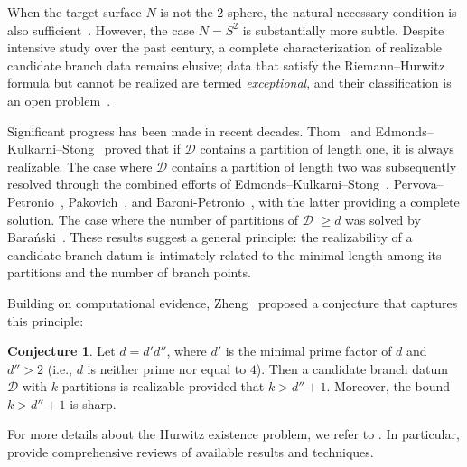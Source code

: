 \documentclass[microtype]{gtpart}     %
\theoremstyle{definition}
\newtheorem{conjecture}{Conjecture}[section]
\begin{document}
When the target surface $N$ is not the $2$-sphere, the natural necessary condition is also sufficient~\cite{EKS84, EZ78, Hus62}. However, the case $N = S^2$ is substantially more subtle. Despite intensive study over the past century, a complete characterization of realizable candidate branch data remains elusive; data that satisfy the Riemann--Hurwitz formula but cannot be realized are termed \emph{exceptional}, and their classification is an open problem~\cite{FP24, WWX25-1, Zhe06, Zhu19}.

Significant progress has been made in recent decades. Thom~\cite{Th65} and Edmonds--Kulkarni--Stong~\cite{EKS84} proved that if $\mathcal{D}$ contains a partition of length one, it is always realizable. The case where $\mathcal{D}$ contains a partition of length two was subsequently resolved through the combined efforts of Edmonds--Kulkarni--Stong~\cite{EKS84}, Pervova--Petronio~\cite{PP06}, Pakovich~\cite{Pak09}, and Baroni-Petronio~\cite{BP24}, with the latter providing a complete solution. The case where the number of partitions of $\mathcal{D}$ $\geq d$ was solved by Bara\'{n}ski~\cite{Bar01}. These results suggest a general principle: the realizability of a candidate branch datum is intimately related to the minimal length among its partitions and the number of branch points.

Building on computational evidence, Zheng~\cite{Zhe06} proposed a conjecture that captures this principle:

\begin{conjecture}\cite{Zhe06}\label{conj}
Let $d = d' d''$, where $d'$ is the minimal prime factor of $d$ and $d'' > 2$ (i.e., $d$ is neither prime nor equal to $4$). Then a candidate branch datum $\mathcal{D}$ with $k$ partitions is realizable provided that $k > d'' + 1$. Moreover, the bound $k > d'' + 1$ is sharp.
\end{conjecture}

For more details about the Hurwitz existence problem, we refer to \cite{Bar01,Bo82,Ger87,Hus62,KZ96,PP09,PP12,PP06,PP08,PP07,P20,SX20}. In particular, \cite{PP07, P20} provide comprehensive reviews of available results and techniques.
\end{document}
